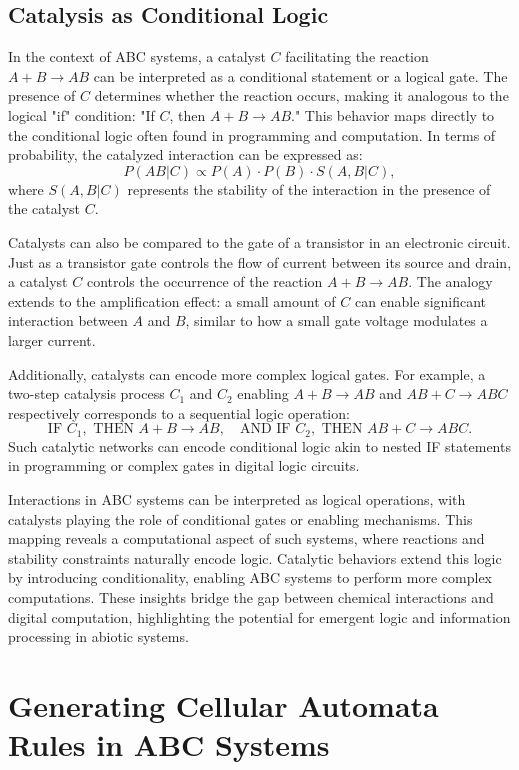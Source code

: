 \documentclass[entropy,article,submit,pdftex,moreauthors]{Definitions/mdpi}
\begin{document}
\subsection{Catalysis as Conditional Logic}

In the context of ABC systems, a catalyst \( C \) facilitating the reaction \( A + B \to AB \) can be interpreted as a conditional statement or a logical gate. The presence of \( C \) determines whether the reaction occurs, making it analogous to the logical "if" condition: "If \( C \), then \( A + B \to AB \)."
This behavior maps directly to the conditional logic often found in programming and computation. In terms of probability, the catalyzed interaction can be expressed as:
\[
P(AB | C) \propto P(A) \cdot P(B) \cdot S(A, B | C),
\]
where \( S(A, B | C) \) represents the stability of the interaction in the presence of the catalyst \( C \).

Catalysts can also be compared to the gate of a transistor in an electronic circuit. Just as a transistor gate controls the flow of current between its source and drain, a catalyst \( C \) controls the occurrence of the reaction \( A + B \to AB \). The analogy extends to the amplification effect: a small amount of \( C \) can enable significant interaction between \( A \) and \( B \), similar to how a small gate voltage modulates a larger current.

Additionally, catalysts can encode more complex logical gates. For example, a two-step catalysis process \( C_1 \) and \( C_2 \) enabling \( A + B \to AB \) and \( AB + C \to ABC \) respectively corresponds to a sequential logic operation:
\[
\text{IF } C_1, \text{ THEN } A + B \to AB, \quad \text{AND IF } C_2, \text{ THEN } AB + C \to ABC.
\]
Such catalytic networks can encode conditional logic akin to nested IF statements in programming or complex gates in digital logic circuits. 

Interactions in ABC systems can be interpreted as logical operations, with catalysts playing the role of conditional gates or enabling mechanisms. This mapping reveals a computational aspect of such systems, where reactions and stability constraints naturally encode logic. Catalytic behaviors extend this logic by introducing conditionality, enabling ABC systems to perform more complex computations. These insights bridge the gap between chemical interactions and digital computation, highlighting the potential for emergent logic and information processing in abiotic systems.


\section{Generating Cellular Automata Rules in ABC Systems}
\end{document}
